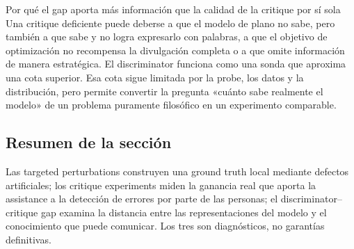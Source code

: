 \begin{importantbox}{Por qué el gap aporta más información que la calidad de la critique por sí sola}
Una critique deficiente puede deberse a que el modelo de plano no sabe, pero también a que sabe y no logra expresarlo con palabras, a que el objetivo de optimización no recompensa la divulgación completa o a que omite información de manera estratégica. El discriminator funciona como una sonda que aproxima una cota superior. Esa cota sigue limitada por la probe, los datos y la distribución, pero permite convertir la pregunta «cuánto sabe realmente el modelo» de un problema puramente filosófico en un experimento comparable.
\end{importantbox}

\subsection{Resumen de la sección}

Las targeted perturbations construyen una ground truth local mediante defectos artificiales; los critique experiments miden la ganancia real que aporta la assistance a la detección de errores por parte de las personas; el discriminator--critique gap examina la distancia entre las representaciones del modelo y el conocimiento que puede comunicar. Los tres son diagnósticos, no garantías definitivas.
